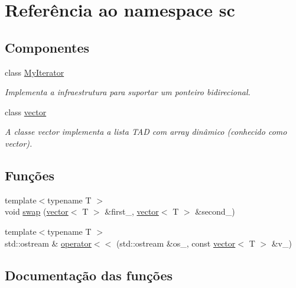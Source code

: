 \hypertarget{namespacesc}{}\section{Referência ao namespace sc}
\label{namespacesc}
\subsection*{Componentes}
\begin{DoxyCompactItemize}
\item 
class \hyperlink{classsc_1_1MyIterator}{My\+Iterator}
\begin{DoxyCompactList}\small\item\em Implementa a infraestrutura para suportar um ponteiro bidirecional. \end{DoxyCompactList}\item 
class \hyperlink{classsc_1_1vector}{vector}
\begin{DoxyCompactList}\small\item\em A classe vector implementa a lista T\+AD com array dinâmico (conhecido como vector). \end{DoxyCompactList}\end{DoxyCompactItemize}
\subsection*{Funções}
\begin{DoxyCompactItemize}
\item 
{\footnotesize template$<$typename T $>$ }\\void \hyperlink{namespacesc_ac8c8a40b2448b8d340e7d5019dc6fc70}{swap} (\hyperlink{classsc_1_1vector}{vector}$<$ T $>$ \&first\+\_\+, \hyperlink{classsc_1_1vector}{vector}$<$ T $>$ \&second\+\_\+)
\item 
{\footnotesize template$<$typename T $>$ }\\std\+::ostream \& \hyperlink{namespacesc_a3817d7e14aea07badea7976d5c4784fa}{operator$<$$<$} (std\+::ostream \&os\+\_\+, const \hyperlink{classsc_1_1vector}{vector}$<$ T $>$ \&v\+\_\+)
\end{DoxyCompactItemize}


\subsection{Documentação das funções}
\mbox{\label{namespacesc_a3817d7e14aea07badea7976d5c4784fa}} 
